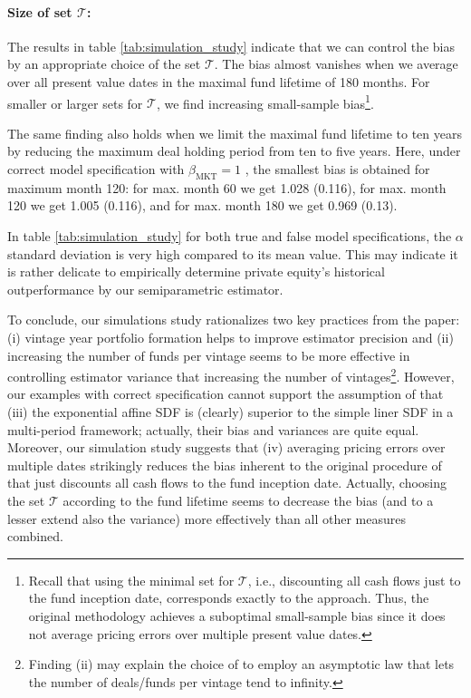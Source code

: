 \documentclass[12pt]{article}
\begin{document}
\paragraph{Size of set $\mathcal{T}$:}
The results in table \ref{tab:simulation_study} indicate that we can control the bias by an appropriate choice of the set $\mathcal{T}$.
The bias almost vanishes when we average over all present value dates in the maximal fund lifetime of 180 months. 
For smaller or larger sets for $\mathcal{T}$, we find increasing small-sample bias\footnote{Recall that using the minimal set for $\mathcal{T}$, i.e., discounting all cash flows just to the fund inception date, corresponds exactly to the \cite{DLP12} approach. Thus, the original \cite{DLP12} methodology achieves a suboptimal small-sample bias since it does not average pricing errors over multiple present value dates.}.

The same finding also holds when we limit the maximal fund lifetime to ten years by reducing the maximum deal holding period from ten to five years. 
Here, under correct model specification with $\beta_{\mathrm{MKT}}=1$ , the smallest bias is obtained for maximum month 120:
for max. month 60 we get 1.028 (0.116), for max. month 120 we get 1.005 (0.116), and for max. month 180 we get 0.969 (0.13).

In table \ref{tab:simulation_study} for both true and false model specifications, the $\alpha$ standard deviation is very high compared to its mean value.
This may indicate it is rather delicate to empirically determine private equity's historical outperformance by our semiparametric estimator. \newline

To conclude, our simulations study rationalizes two key practices from the \cite{DLP12} paper: (i) vintage year portfolio formation helps to improve estimator precision and (ii) increasing the number of funds per vintage seems to be more effective in controlling estimator variance that increasing the number of vintages\footnote{Finding (ii) may explain the choice of \cite{DLP12} to employ an asymptotic law that lets the number of deals/funds per vintage tend to infinity.}.
However, our examples with correct specification cannot support the assumption of \cite{KN16} that (iii) the exponential affine SDF is (clearly) superior to the simple liner SDF in a multi-period framework; actually, their bias and variances are quite equal.
Moreover, our simulation study suggests that (iv) averaging pricing errors over multiple dates strikingly reduces the bias inherent to the original procedure of \cite{DLP12} that just discounts all cash flows to the fund inception date.
Actually, choosing the set $\mathcal{T}$ according to the fund lifetime seems to decrease the bias (and to a lesser extend also the variance) more effectively than all other measures combined.
\end{document}
